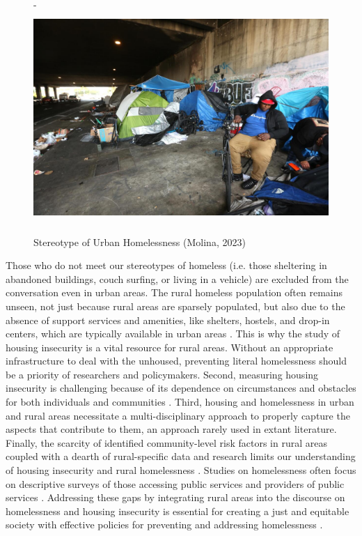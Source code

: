 \begin{figure}[htbp] 

    \centering 
    -
    \includegraphics[width=\textwidth, height=8cm]{plots/homeless.jpeg} 
    
    \caption[Stereotype of Urban Homelessness]{Stereotype of Urban Homelessness (Molina, 2023)} 
    
    \label{fig:urban_homeless} 
    
\end{figure} 

\pagebreak

Those who do not meet our stereotypes of homeless (i.e. those sheltering in abandoned buildings, couch surfing, or living in a vehicle) are excluded from the conversation even in urban areas. The rural homeless population often remains unseen, not just because rural areas are sparsely populated, but also due to the absence of support services and amenities, like shelters, hostels, and drop-in centers, which are typically available in urban areas \citep{cloke_handbook_2006}. This is why the study of housing insecurity is a vital resource for rural areas. Without an appropriate infrastructure to deal with the unhoused, preventing literal homelessness should be a priority of researchers and policymakers. Second, measuring housing insecurity is challenging because of its dependence on circumstances and obstacles for both individuals and communities \citep{leifheit_building_2022}. Third, housing and homelessness in urban and rural areas necessitate a multi-disciplinary approach to properly capture the aspects that contribute to them, an approach rarely used in extant literature. Finally, the scarcity of identified community-level risk factors in rural areas coupled with a dearth of rural-specific data and research limits our understanding of housing insecurity and rural homelessness \citep{gleason_using_2021}. Studies on homelessness often focus on descriptive surveys of those accessing public services and providers of public services \citep{robertson_rural_2007}. Addressing these gaps by integrating rural areas into the discourse on homelessness and housing insecurity is essential for creating a just and equitable society with effective policies for preventing and addressing homelessness \citep{oregan_how_2021}. 

